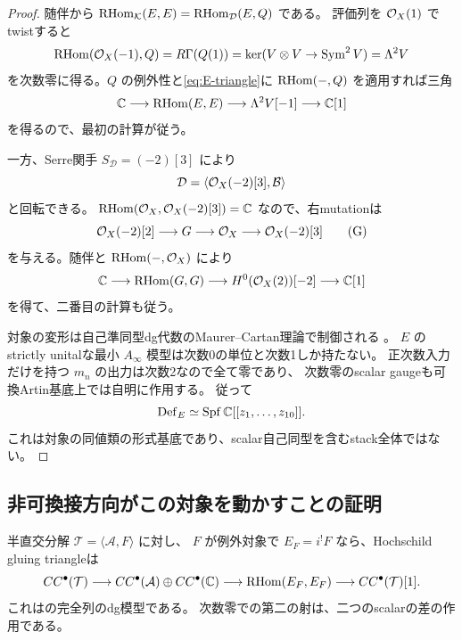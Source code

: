 \begin{proof}
随伴から $\operatorname{RHom}_{\mathcal K}(E,E)=\operatorname{RHom}_{\mathcal D}(E,Q)$ である。
評価列を $\mathcal O_X(1)$ でtwistすると
\[
 \operatorname{RHom}(\mathcal O_X(-1),Q)=R\Gamma(Q(1))
 =\ker(V\otimes V\to\operatorname{Sym}^2V)=\Lambda^2V
\]
を次数零に得る。$Q$ の例外性と\eqref{eq:E-triangle}に
$\operatorname{RHom}(-,Q)$ を適用すれば三角
\[
 \mathbb C\longrightarrow\operatorname{RHom}(E,E)\longrightarrow
 \Lambda^2V[-1]\longrightarrow\mathbb C[1]
\]
を得るので、最初の計算が従う。

一方、Serre関手 $S_{\mathcal D}=(-2)[3]$ により
\[
 \mathcal D=\langle\mathcal O_X(-2)[3],\mathcal B\rangle
\]
と回転できる。
$\operatorname{RHom}(\mathcal O_X,\mathcal O_X(-2)[3])=\mathbb C$ なので、右mutationは
\[
 \mathcal O_X(-2)[2]\longrightarrow G\longrightarrow\mathcal O_X
 \longrightarrow\mathcal O_X(-2)[3] \tag{G}\label{eq:G-triangle}
\]
を与える。随伴と $\operatorname{RHom}(-,\mathcal O_X)$ により
\[
 \mathbb C\longrightarrow\operatorname{RHom}(G,G)\longrightarrow
 H^0(\mathcal O_X(2))[-2]\longrightarrow\mathbb C[1]
\]
を得て、二番目の計算も従う。

対象の変形は自己準同型dg代数のMaurer--Cartan理論で制御される
\cite[Proposition 6.1]{ELOI}\cite[Theorems 7.2, 11.8]{ELOII}。
$E$ のstrictly unitalな最小 $A_\infty$ 模型は次数0の単位と次数1しか持たない。
正次数入力だけを持つ $m_n$ の出力は次数2なので全て零であり、
次数零のscalar gaugeも可換Artin基底上では自明に作用する。
従って
\[
 \operatorname{Def}_E\simeq\operatorname{Spf}\mathbb C[[z_1,\ldots,z_{10}]].
\]
これは対象の同値類の形式基底であり、scalar自己同型を含むstack全体ではない。
\end{proof}

\subsection{非可換接方向がこの対象を動かすことの証明}

半直交分解 $\mathcal T=\langle\mathcal A,F\rangle$ に対し、
$F$ が例外対象で $E_F=i^!F$ なら、Hochschild gluing triangleは
\begin{equation}\label{eq:gluing-triangle}
 CC^\bullet(\mathcal T)\longrightarrow
 CC^\bullet(\mathcal A)\oplus CC^\bullet(\mathbb C)
 \longrightarrow\operatorname{RHom}(E_F,E_F)
 \longrightarrow CC^\bullet(\mathcal T)[1].
\end{equation}
これは\cite[Theorem 7.7, Remark 7.8]{Kuz}の完全列のdg模型である。
次数零での第二の射は、二つのscalarの差の作用である。

